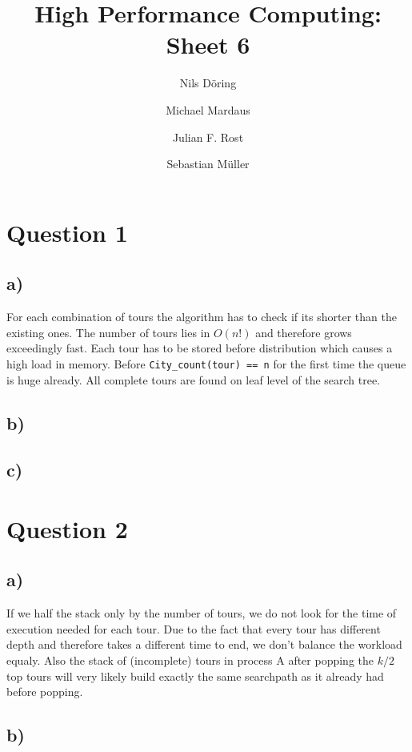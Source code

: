 \documentclass[10pt,a4paper]{scrartcl}
\author{Nils Döring \and Michael Mardaus \and Julian F. Rost \and Sebastian Müller}
\title{High Performance Computing: Sheet 6}
\begin{document}
\maketitle


\section{Question 1}

\subsection{a)}

        For each combination of tours the algorithm has to check if its shorter
        than the existing ones. The number of tours lies in $O(n!)$ and
        therefore grows exceedingly fast. Each tour has to be stored before
        distribution which causes a high load in memory. Before \texttt{City\_count(tour) == n}
        for the first time the queue is huge already. All complete tours are found on leaf level 
        of the search tree.

\subsection{b)}

\subsection{c)}


\section{Question 2}

\subsection{a)}

        If we half the stack only by the number of tours, we do not look for the
        time of execution needed for each tour. Due to the fact that every tour
        has different depth and therefore takes a different time to end, we
        don't balance the workload equaly.
        Also the stack of (incomplete) tours in process A after popping the $k/2$
        top tours will very likely build exactly the same searchpath as it already
        had before popping.

\subsection{b)}
\end{document}
